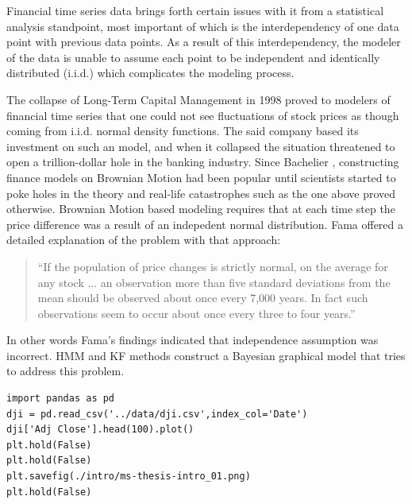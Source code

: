 Financial time series data brings forth certain issues with it from a
statistical analysis standpoint, most important of which is the interdependency
of one data point with previous data points. As a result of this
interdependency, the modeler of the data is unable to assume each point to be
independent and identically distributed (i.i.d.) which complicates the modeling
process.

The collapse of Long-Term Capital Management in 1998 proved to modelers of
financial time series that one could not see fluctuations of stock prices as
though coming from i.i.d. normal density functions. The said company based its
investment on such an model, and when it collapsed the situation threatened to
open a trillion-dollar hole in the banking industry. Since Bachelier
\cite{bachelier}, constructing finance models on Brownian Motion had been
popular until scientists started to poke holes in the theory and real-life
catastrophes such as the one above proved otherwise. Brownian Motion based
modeling requires that at each time step the price difference was a result of an
indepedent normal distribution. Fama \cite{fama} offered a detailed explanation
of the problem with that approach:

\begin{quote}
``If the population of price changes is strictly normal, on the average for any
stock ... an observation more than five standard deviations from the mean
should be observed about once every 7,000 years. In fact such observations
seem to occur about once every three to four years.''
\end{quote}

In other words Fama's findings indicated that independence assumption was
incorrect. HMM and KF methods construct a Bayesian graphical model that tries to
address this problem.

\begin{verbatim}
import pandas as pd
dji = pd.read_csv('../data/dji.csv',index_col='Date')
dji['Adj Close'].head(100).plot()
plt.hold(False)
plt.hold(False)
plt.savefig(./intro/ms-thesis-intro_01.png)
plt.hold(False)
\end{verbatim}


